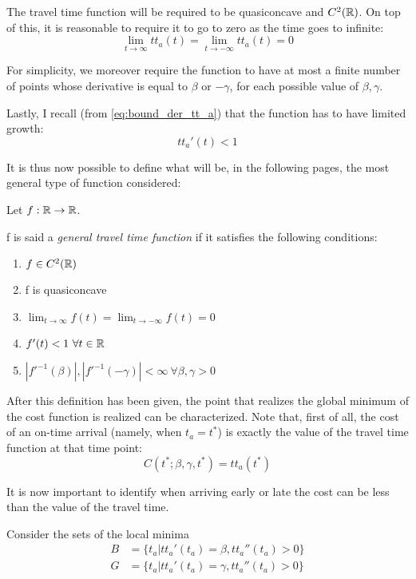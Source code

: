 The travel time function will be required to be quasiconcave and \(C^2(\mathbb{R})\).
On top of this, it is reasonable to require it to go to zero as the time goes to infinite:
\begin{equation*}
  \lim_{t \rightarrow \infty} tt_a(t) = \lim_{t \rightarrow -\infty}tt_a(t) = 0
\end{equation*}

For simplicity, we moreover require the function to have at most a finite number of points whose derivative is equal to \(\beta\) or \(-\gamma\), for each possible value of \(\beta, \gamma\).

Lastly, I recall (from \eqref{eq:bound_der_tt_a}) that the function has to have limited growth:
\[tt_a'(t) < 1\]

It is thus now possible to define what will be, in the following pages,
the most general type of function considered:

\begin{definition}
  \label{def:gen_tt}
  Let \(f:\mathbb{R} \rightarrow \mathbb{R}\).

  f is said a \textit{general travel time function} if it satisfies the following conditions:
  \begin{enumerate}
  \item \(f \in C^2(\mathbb{R})\)
  \item f is quasiconcave
  \item \(\lim_{t \rightarrow \infty} f(t) = \lim_{t \rightarrow -\infty}f(t) = 0\)
  \item \(f'(t) < 1\ \forall t\in \mathbb{R}\)
  \item \(|f'^{-1}(\beta)|, |f'^{-1}(-\gamma)| < \infty\ \forall \beta, \gamma > 0\)
  \end{enumerate}
\end{definition}

After this definition has been given, the point that realizes the global minimum of the cost function is realized can be characterized.
Note that, first of all,
the cost of an on-time arrival (namely, when \(t_a = t^*\)) is exactly the value of the travel time function at that time point:
\begin{equation}
  \label{eq:cost_ot}
  C(t^*; \beta, \gamma, t^*) = tt_a(t^*)
\end{equation}

It is now important to identify when arriving early or late the cost can be less than the value of the travel time.

Consider the sets of the local minima
\begin{equation}
  \label{eq:def_b_g}
  \begin{split}
    B & = \{t_a | tt_a'(t_a) = \beta, tt_a''(t_a) > 0\} \\
    G & = \{t_a | tt_a'(t_a) = \gamma, tt_a''(t_a) > 0\}
  \end{split}
\end{equation}

